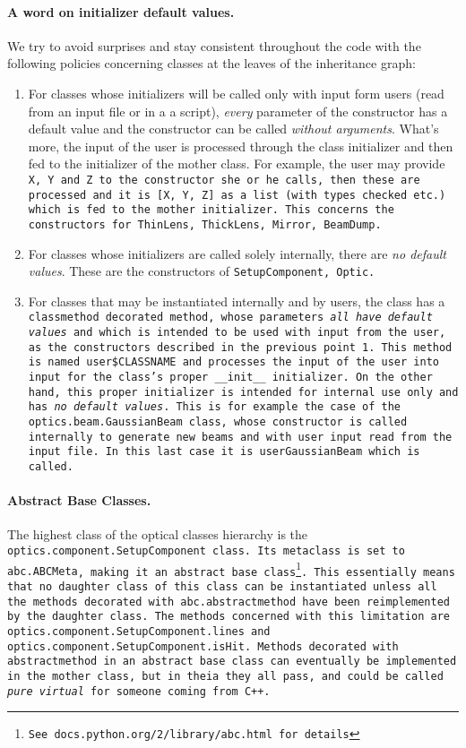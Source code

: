 \documentclass{article}
\begin{document}
\paragraph{A word on initializer default values.}We try to avoid surprises and stay consistent throughout the code with the following policies concerning classes at the leaves of the inheritance graph:

\begin{enumerate}
\item For classes whose initializers will be called only with input form users (read from an input file or in a a script), \textit{every} parameter of the constructor has a default value and the constructor can be called \textit{without arguments}. What's more, the input of the user is processed through the class initializer and then fed to the initializer of the mother class. For example, the user may provide \tt{X}, \tt{Y} and \tt{Z} to the constructor she or he calls, then these are processed and it is \tt{[X, Y, Z]} as a list (with types checked etc.) which is fed to the mother initializer. This concerns the constructors for \tt{ThinLens}, \tt{ThickLens}, \tt{Mirror}, \tt{BeamDump}.

\item For classes whose initializers are called solely internally, there are \textit{no default values}. These are the constructors of \tt{SetupComponent}, \tt{Optic}.

\item For classes that may be instantiated internally and by users, the class has a \tt{classmethod} decorated method, whose parameters \textit{all have default values} and which is intended to be used with input from the user, as the constructors described in the previous point 1. This method is named \tt{user\$CLASSNAME} and processes the input of the user into input for the class's proper \tt{\_\_init\_\_} initializer. On the other hand, this proper initializer is intended for internal use only and has \textit{no default values}. This is for example the case of the \tt{optics.beam.GaussianBeam} class, whose constructor is called internally to generate new beams and with user input read from the input file. In this last case it is \tt{userGaussianBeam} which is called.
\end{enumerate}

\paragraph{Abstract Base Classes.}The highest class of the optical classes hierarchy is the \tt{optics.component.SetupComponent} class. Its metaclass is set to \tt{abc.ABCMeta}, making it an abstract base class\footnote{See \tt{docs.python.org/2/library/abc.html} for details}. This essentially means that no daughter class of this class can be instantiated unless all the methods decorated with \tt{abc.abstractmethod} have been reimplemented by the daughter class. The methods concerned with this limitation are \tt{optics.component.SetupComponent.lines} and \tt{optics.component.SetupComponent.isHit}. Methods decorated with \tt{abstractmethod} in an abstract base class can eventually be implemented in the mother class, but in theia they all \tt{pass}, and could be called \textit{pure virtual} for someone coming from C++.
\end{document}
